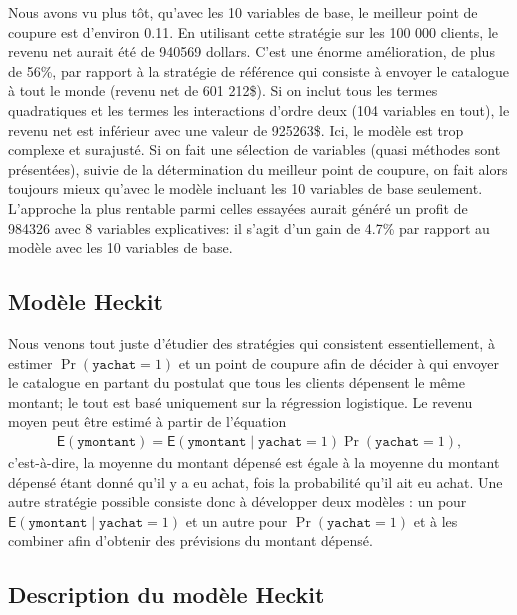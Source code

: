 \documentclass[
  11pt,
  letterpaper,
]{scrbook}
\theoremstyle{definition}
\theoremstyle{remark}
\begin{document}
Nous avons vu plus tôt, qu'avec les 10 variables de base, le meilleur
point de coupure est d'environ 0.11. En utilisant cette stratégie sur
les 100 000 clients, le revenu net aurait été de 940569 dollars. C'est
une énorme amélioration, de plus de 56\%, par rapport à la stratégie de
référence qui consiste à envoyer le catalogue à tout le monde (revenu
net de 601 212\$). Si on inclut tous les termes quadratiques et les
termes les interactions d'ordre deux (104 variables en tout), le revenu
net est inférieur avec une valeur de 925263\$. Ici, le modèle est trop
complexe et surajusté. Si on fait une sélection de variables (quasi
méthodes sont présentées), suivie de la détermination du meilleur point
de coupure, on fait alors toujours mieux qu'avec le modèle incluant les
10 variables de base seulement. L'approche la plus rentable parmi celles
essayées aurait généré un profit de 984326 avec 8 variables
explicatives: il s'agit d'un gain de 4.7\% par rapport au modèle avec
les 10 variables de base.

\subsection{Modèle Heckit}\label{moduxe8le-heckit}

Nous venons tout juste d'étudier des stratégies qui consistent
essentiellement, à estimer \(\Pr(\texttt{yachat}=1)\) et un point de
coupure afin de décider à qui envoyer le catalogue en partant du
postulat que tous les clients dépensent le même montant; le tout est
basé uniquement sur la régression logistique. Le revenu moyen peut être
estimé à partir de l'équation \begin{align*}
\mathsf{E}(\texttt{ymontant}) = \mathsf{E}(\texttt{ymontant} \mid \texttt{yachat}=1) \Pr(\texttt{yachat
}=1),
\end{align*} c'est-à-dire, la moyenne du montant dépensé est égale à la
moyenne du montant dépensé étant donné qu'il y a eu achat, fois la
probabilité qu'il ait eu achat. Une autre stratégie possible consiste
donc à développer deux modèles : un pour
\(\mathsf{E}(\texttt{ymontant} \mid \texttt{yachat}=1)\) et un autre
pour \(\Pr(\texttt{yachat}=1)\) et à les combiner afin d'obtenir des
prévisions du montant dépensé.

\subsection*{Description du modèle
Heckit}\label{description-du-moduxe8le-heckit}
\end{document}

